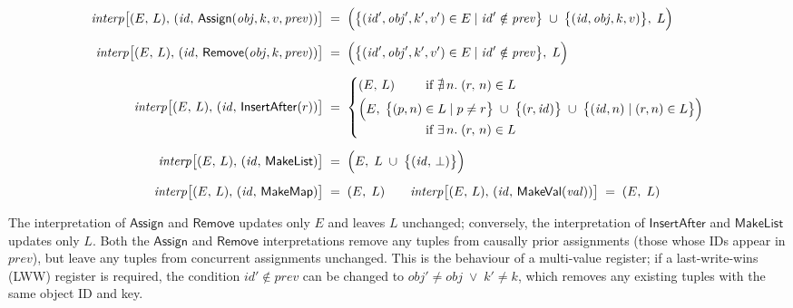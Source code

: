 \begin{align*}
    \mathit{interp}\big[(E,\, L),\, (\mathit{id},\, \mathsf{Assign}(\mathit{obj}, k, v, \mathit{prev})) \big] &\;=\; \Big(
    \big\{ (\mathit{id}', \mathit{obj}', k', v') \in E \mid
    \mathit{id}' \notin \mathit{prev} \big\} \;\cup\;
    \big\{ (\mathit{id}, \mathit{obj}, k, v) \big\},\; L \Big) \\[5pt]
    \mathit{interp}\big[(E,\, L),\, (\mathit{id},\, \mathsf{Remove}(\mathit{obj}, k, \mathit{prev})) \big] &\;=\; \Big(
    \big\{ (\mathit{id}', \mathit{obj}', k', v') \in E \mid
    \mathit{id}' \notin \mathit{prev} \big\},\; L \Big) \\[5pt]
    \mathit{interp}\big[(E,\, L),\, (\mathit{id},\, \mathsf{InsertAfter}(r)) \big] &\;=\; \left\{
        \arraycolsep=0pt \def\arraystretch{1.2}
        \begin{array}{ll}
            (E,\, L) & \text{if } \nexists\,n.\; (r,\, n) \in L\\[3pt]
            \Big(E,\; \big\{ (p,n) \;&\in L \mid p \neq r \big\} \;\cup\;
            \big\{ (r, \mathit{id}) \big\} \;\cup\;
            \big\{ (\mathit{id}, n) \mid (r, n) \in L \big\} \Big)\\
            & \text{if } \exists\,n.\; (r,\,n) \in L
        \end{array} \right. \\[5pt]
    \mathit{interp}\big[(E,\, L),\, (\mathit{id},\, \mathsf{MakeList}) \big] &\;=\; \Big(
    E,\; L \;\cup\; \big\{(\mathit{id},\, \bot)\big\}\Big) \\[5pt]
    \mathit{interp}\big[(E,\, L),\, (\mathit{id},\, \mathsf{MakeMap}) \big] &\;=\; (E,\; L)\qquad
    \mathit{interp}\big[(E,\, L),\, (\mathit{id},\, \mathsf{MakeVal}(\mathit{val})) \big] \;=\; (E,\; L)
\end{align*}

The interpretation of $\mathsf{Assign}$ and $\mathsf{Remove}$ updates only $E$ and leaves $L$ unchanged; conversely, the interpretation of $\mathsf{InsertAfter}$ and $\mathsf{MakeList}$ updates only $L$.
Both the $\mathsf{Assign}$ and $\mathsf{Remove}$ interpretations remove any tuples from causally prior assignments (those whose IDs appear in $\mathit{prev}$), but leave any tuples from concurrent assignments unchanged.
This is the behaviour of a multi-value register; if a last-write-wins (LWW) register is required, the condition $\mathit{id}' \notin \mathit{prev}$ can be changed to $\mathit{obj}' \neq \mathit{obj} \;\vee\; k' \neq k$, which removes any existing tuples with the same object ID and key.

